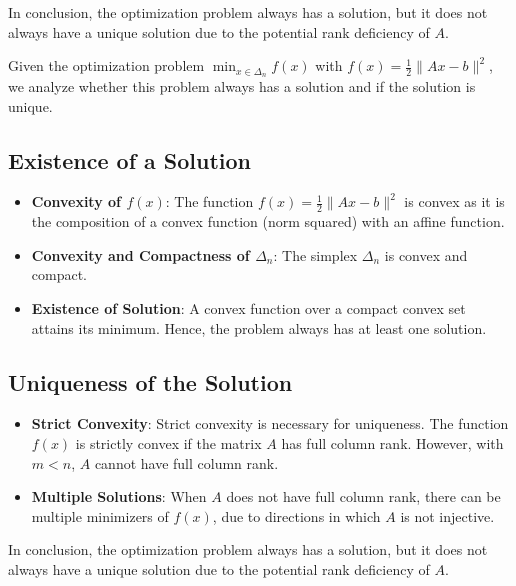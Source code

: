 \documentclass[12p]{article}
\begin{document}
In conclusion, the optimization problem always has a solution, but it does not always have a unique solution due to the potential rank deficiency of \( A \).

















Given the optimization problem \( \min_{x \in \Delta_n} f(x) \) with \( f(x) = \frac{1}{2} \|Ax - b\|^2 \), we analyze whether this problem always has a solution and if the solution is unique.

\subsection*{Existence of a Solution}
\begin{itemize}
    \item \textbf{Convexity of \( f(x) \)}: The function \( f(x) = \frac{1}{2} \|Ax - b\|^2 \) is convex as it is the composition of a convex function (norm squared) with an affine function.
    \item \textbf{Convexity and Compactness of \( \Delta_n \)}: The simplex \( \Delta_n \) is convex and compact.
    \item \textbf{Existence of Solution}: A convex function over a compact convex set attains its minimum. Hence, the problem always has at least one solution.
\end{itemize}

\subsection*{Uniqueness of the Solution}
\begin{itemize}
    \item \textbf{Strict Convexity}: Strict convexity is necessary for uniqueness. The function \( f(x) \) is strictly convex if the matrix \( A \) has full column rank. However, with \( m < n \), \( A \) cannot have full column rank.
    \item \textbf{Multiple Solutions}: When \( A \) does not have full column rank, there can be multiple minimizers of \( f(x) \), due to directions in which \( A \) is not injective.
\end{itemize}

In conclusion, the optimization problem always has a solution, but it does not always have a unique solution due to the potential rank deficiency of \( A \).
\end{document}
